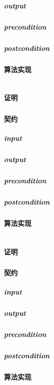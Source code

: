 \documentclass[a4paper]{book}
\numberwithin{equation}{chapter}
\theoremstyle{definition}
\begin{document}
\begin{multicols}{2}
\subparagraph{output}

\subparagraph{precondition}

\subparagraph{postcondition}

\paragraph{算法实现}
\begin{lstlisting}

\end{lstlisting}
\paragraph{证明}

\subsubsection{}
\paragraph{契约}
\subparagraph{input}

\subparagraph{output}

\subparagraph{precondition}

\subparagraph{postcondition}

\paragraph{算法实现}
\begin{lstlisting}

\end{lstlisting}
\paragraph{证明}

\subsubsection{}
\paragraph{契约}
\subparagraph{input}

\subparagraph{output}

\subparagraph{precondition}

\subparagraph{postcondition}

\paragraph{算法实现}
\begin{lstlisting}


\end{lstlisting}
\end{multicols}
\end{document}
